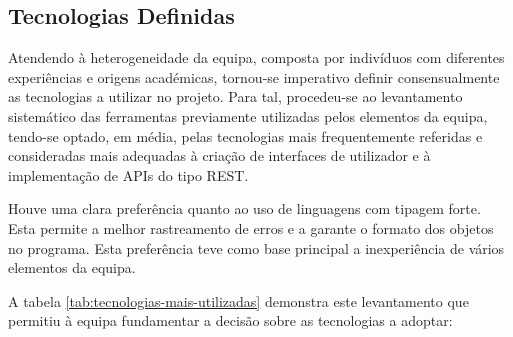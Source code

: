 \subsection{Tecnologias Definidas}

Atendendo à heterogeneidade da equipa, composta por indivíduos com diferentes experiências e origens académicas, tornou-se imperativo definir consensualmente as tecnologias a utilizar no projeto. Para tal, procedeu-se ao levantamento sistemático das ferramentas previamente utilizadas pelos elementos da equipa, tendo-se optado, em média, pelas tecnologias mais frequentemente referidas e consideradas mais adequadas à criação de interfaces de utilizador e à implementação de APIs do tipo REST.



Houve uma clara preferência quanto ao uso de linguagens com tipagem forte. Esta permite a melhor rastreamento de erros e a garante o formato dos objetos no programa. Esta preferência teve como base principal a inexperiência de vários elementos da equipa.

A tabela \ref{tab:tecnologias-mais-utilizadas} demonstra este levantamento que permitiu à equipa fundamentar a decisão sobre as tecnologias a adoptar:

